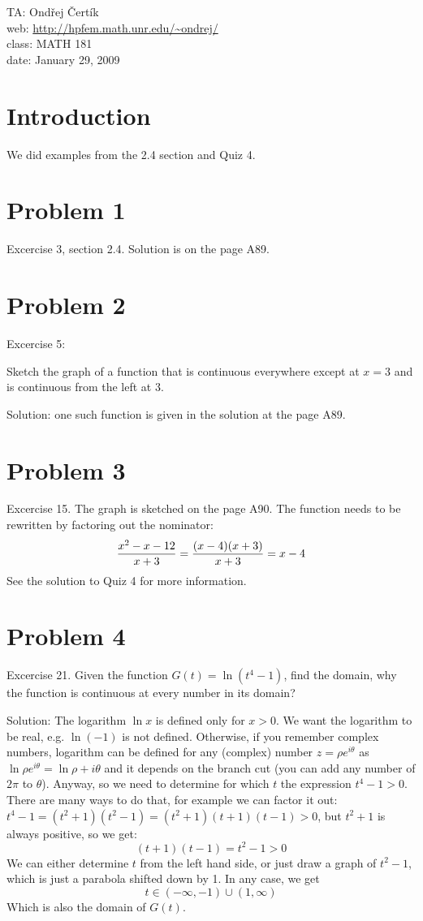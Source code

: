 \documentclass[10pt]{article}
\begin{document}
\noindent TA: Ondřej Čertík\\
web: \url{http://hpfem.math.unr.edu/~ondrej/}\\
class: MATH 181\\
date: January 29, 2009

\section{Introduction}

We did examples from the 2.4 section and Quiz 4.

\section{Problem 1}

Excercise 3, section 2.4. Solution is on the page A89.

\section{Problem 2}

Excercise 5:

Sketch the graph of a function that is continuous everywhere except at $x=3$
and is continuous from the left at 3.

Solution: one such function is given in the solution at the page A89.

\section{Problem 3}

Excercise 15. The graph is sketched on the page A90. The function needs to be
rewritten by factoring out the nominator:
$${x^2-x-12\over x+3} = {(x-4)(x+3)\over x+3} = x-4$$
See the solution to Quiz 4 for more information.

\section{Problem 4}

Excercise 21. Given the function $G(t) = \ln(t^4-1)$, find the domain, why the
function is continuous at every number in its domain?

Solution: The logarithm $\ln x$ is defined only for $x>0$. We want the
logarithm to be real, e.g. $\ln(-1)$ is not defined. Otherwise, if you remember
complex numbers, logarithm can be defined for any (complex) number $z=\rho
e^{i\theta}$ as $\ln \rho e^{i\theta} = \ln\rho+i\theta$ and it depends on the
branch cut (you can add any number of $2\pi$ to $\theta$). Anyway, so we need
to determine for which $t$ the expression $t^4-1>0$. There are many ways to do
that, for example we can factor it out: $t^4-1 = (t^2+1)(t^2-1) =
(t^2+1)(t+1)(t-1)>0$, but $t^2+1$ is always positive, so we get:
$$(t+1)(t-1) = t^2-1 >0$$
We can either determine $t$ from the left hand side, or just draw a graph of
$t^2-1$, which is just a parabola shifted down by 1. In any case, we get
$$t\in (-\infty, -1) \cup (1, \infty)$$
Which is also the domain of $G(t)$.
\end{document}
